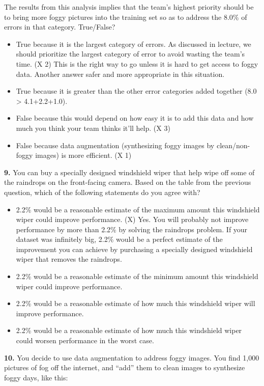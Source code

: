 The results from this analysis implies that the team’s highest priority should be to bring more foggy pictures into the training set so as to address the 8.0\% of errors in that category. True/False?
\begin{itemize}
    \item True because it is the largest category of errors. As discussed in lecture, we should prioritize the largest category of error to avoid wasting the team’s time. (X 2) This is the right way to go unless it is hard to get access to foggy data. Another answer safer and more appropriate in this situation.
    \item True because it is greater than the other error categories added together (8.0 > 4.1+2.2+1.0).
    \item False because this would depend on how easy it is to add this data and how much you think your team thinks it’ll help. (X 3)
    \item False because data augmentation (synthesizing foggy images by clean/non-foggy images) is more efficient. (X 1)
\end{itemize}
\textbf{9.} You can buy a specially designed windshield wiper that help wipe off some of the raindrops on the front-facing camera. Based on the table from the previous question, which of the following statements do you agree with?
\begin{itemize}
    \item 2.2\% would be a reasonable estimate of the maximum amount this windshield wiper could improve performance. (X) Yes. You will probably not improve performance by more than 2.2\% by solving the raindrops problem. If your dataset was infinitely big, 2.2\% would be a perfect estimate of the improvement you can achieve by purchasing a specially designed windshield wiper that removes the raindrops.
    \item 2.2\% would be a reasonable estimate of the minimum amount this windshield wiper could improve performance.
    \item 2.2\% would be a reasonable estimate of how much this windshield wiper will improve performance.
    \item 2.2\% would be a reasonable estimate of how much this windshield wiper could worsen performance in the worst case.
\end{itemize}
\textbf{10.} You decide to use data augmentation to address foggy images. You find 1,000 pictures of fog off the internet, and “add” them to clean images to synthesize foggy days, like this:

